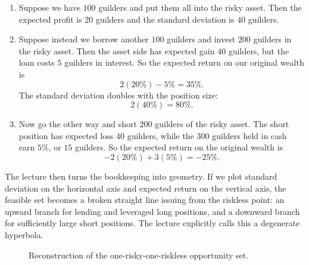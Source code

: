 \begin{enumerate}
\item Suppose we have \(100\) guilders and put them all into the risky asset. Then the expected profit is \(20\) guilders and the standard deviation is \(40\) guilders.
\item Suppose instead we borrow another \(100\) guilders and invest \(200\) guilders in the risky asset. Then the asset side has expected gain \(40\) guilders, but the loan costs \(5\) guilders in interest. So the expected return on our original wealth is
\begin{equation}
2(20\%) - 5\% = 35\%.
\end{equation}
The standard deviation doubles with the position size:
\begin{equation}
2(40\%) = 80\%.
\end{equation}
\item Now go the other way and short \(200\) guilders of the risky asset. The short position has expected loss \(40\) guilders, while the \(300\) guilders held in cash earn \(5\%\), or \(15\) guilders. So the expected return on the original wealth is
\begin{equation}
-2(20\%) + 3(5\%) = -25\%.
\end{equation}
\end{enumerate}

The lecture then turns the bookkeeping into geometry. If we plot standard deviation on the horizontal axis and expected return on the vertical axis, the feasible set becomes a broken straight line issuing from the riskless point: an upward branch for lending and leveraged long positions, and a downward branch for sufficiently large short positions. The lecture explicitly calls this a degenerate hyperbola.

\begin{figure}[h]
\centering
{}
\caption{Reconstruction of the one-risky-one-riskless opportunity set.}
\end{figure}

